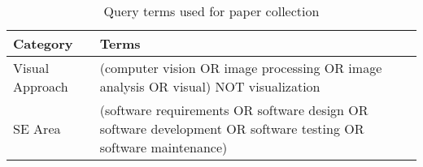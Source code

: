 \begin{table}[t]
\caption{Query terms used for paper collection}
\centering
\footnotesize %
\setlength{\tabcolsep}{4pt}
\renewcommand{\arraystretch}{0.9}

\begin{tabular}{l @{\hskip 1em} p{6.3cm}}
\toprule
\textbf{Category} & \textbf{Terms} \\																
\midrule
			
Visual Approach &  (computer vision OR image processing OR image analysis OR visual) NOT visualization \\ [1ex]

SE Area & (software requirements OR software design OR software development OR software testing OR software maintenance) \\

\bottomrule
\end{tabular}
\label{tbl:terms}
\end{table}
